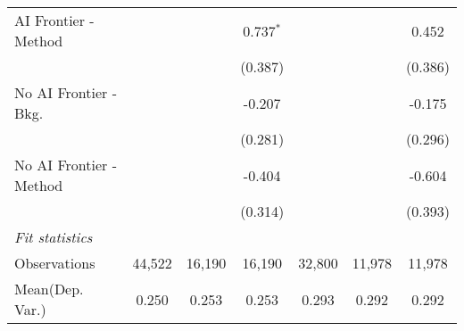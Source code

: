 \begin{tabular}{lcccccc}
   AI Frontier - Method    &               &                & 0.737$^{*}$   &               &               & 0.452\\   
                           &               &                & (0.387)       &               &               & (0.386)\\   
   No AI Frontier - Bkg.   &               &                & -0.207        &               &               & -0.175\\   
                           &               &                & (0.281)       &               &               & (0.296)\\   
   No AI Frontier - Method &               &                & -0.404        &               &               & -0.604\\   
                           &               &                & (0.314)       &               &               & (0.393)\\   
   \midrule
   \emph{Fit statistics}\\
   Observations            & 44,522        & 16,190         & 16,190        & 32,800        & 11,978        & 11,978\\  
Mean(Dep. Var.) & 0.250 & 0.253 & 0.253 & 0.293 & 0.292 & 0.292 \\
   

\end{tabular}
